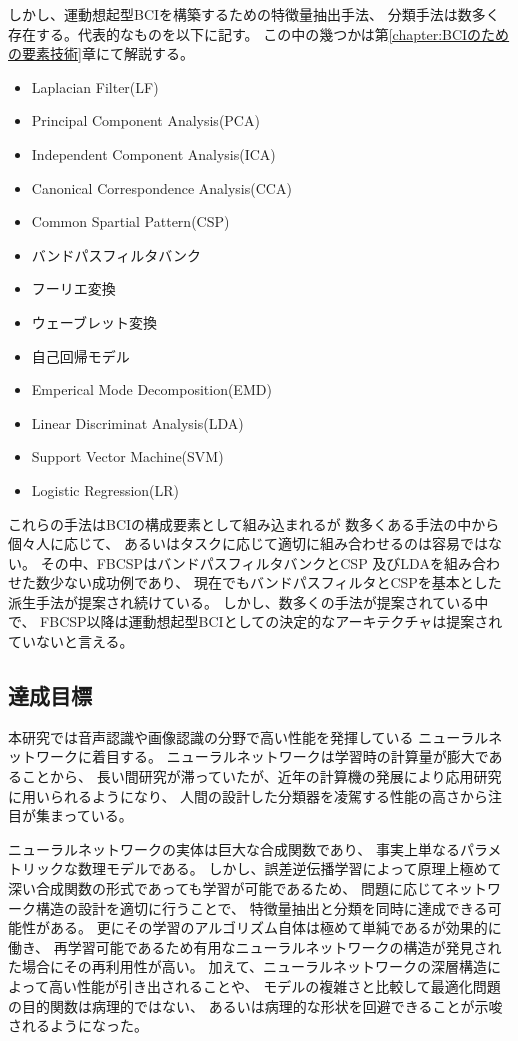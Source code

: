 しかし、運動想起型BCIを構築するための特徴量抽出手法、
分類手法は数多く存在する。代表的なものを以下に記す。
この中の幾つかは第\ref{chapter:BCIのための要素技術}章にて解説する。
\begin{itemize}
    \item Laplacian Filter(LF)
    \item Principal Component Analysis(PCA)
    \item Independent Component Analysis(ICA)
    \item Canonical Correspondence Analysis(CCA)
    \item Common Spartial Pattern(CSP)
    \item バンドパスフィルタバンク
    \item フーリエ変換
    \item ウェーブレット変換
    \item 自己回帰モデル
    \item Emperical Mode Decomposition(EMD)
    \item Linear Discriminat Analysis(LDA)
    \item Support Vector Machine(SVM)
    \item Logistic Regression(LR)
\end{itemize}
これらの手法はBCIの構成要素として組み込まれるが
数多くある手法の中から個々人に応じて、
あるいはタスクに応じて適切に組み合わせるのは容易ではない。
その中、FBCSPはバンドパスフィルタバンクとCSP
及びLDAを組み合わせた数少ない成功例であり、
現在でもバンドパスフィルタとCSPを基本とした
派生手法が提案され続けている\cite{sparsemethod,bootCSP}。
しかし、数多くの手法が提案されている中で、
FBCSP以降は運動想起型BCIとしての決定的なアーキテクチャは提案されていないと言える。

\subsection{\mc 達成目標}
本研究では音声認識や画像認識の分野で高い性能を発揮している
ニューラルネットワークに着目する。
ニューラルネットワークは学習時の計算量が膨大であることから、
長い間研究が滞っていたが、近年の計算機の発展により応用研究に用いられるようになり、
人間の設計した分類器を凌駕する性能の高さから注目が集まっている。

ニューラルネットワークの実体は巨大な合成関数であり、
事実上単なるパラメトリックな数理モデルである。
しかし、誤差逆伝播学習によって原理上極めて
深い合成関数の形式であっても学習が可能であるため、
問題に応じてネットワーク構造の設計を適切に行うことで、
特徴量抽出と分類を同時に達成できる可能性がある。
更にその学習のアルゴリズム自体は極めて単純であるが効果的に働き\cite{CheapLearning}、
再学習可能であるため有用なニューラルネットワークの構造が発見された場合にその再利用性が高い。
加えて、ニューラルネットワークの深層構造によって高い性能が引き出されること\cite{DeepvsShallow}や、
モデルの複雑さと比較して最適化問題の目的関数は病理的ではない、
あるいは病理的な形状を回避できることが示唆されるようになった\cite{ディープローカルミニマム}。

